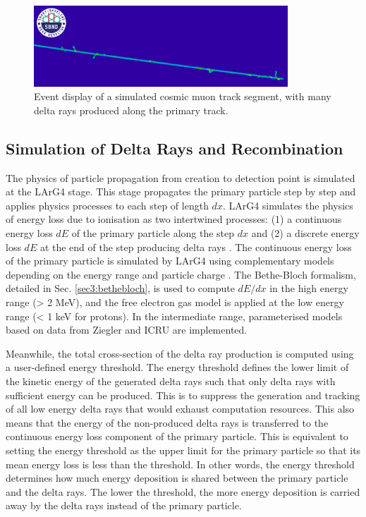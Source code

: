 \begin{figure}[bp!] 
\centering    
\includegraphics[width=0.85\textwidth]{delta_ray_evd}
\caption[delta_ray_evd]{
Event display of a simulated cosmic muon track segment, with many delta rays produced along the primary track.
}
\label{fig:delta_ray_evd}
\end{figure}


\subsection{Simulation of Delta Rays and Recombination}
\label{sec:simDeltaRay}

The physics of particle propagation from creation to detection point is simulated at the LArG4 stage.
This stage propagates the primary particle step by step and applies physics processes to each step of length $dx$.
LArG4 simulates the physics of energy loss due to ionisation as two intertwined processes: (1) a continuous energy loss $dE$ of the primary particle along the step $dx$ and (2) a discrete energy loss $dE$ at the end of the step producing delta rays \cite{geant4}.
The continuous energy loss of the primary particle is simulated by LArG4 using complementary models depending on the energy range and particle charge \cite{geant4_ions}.
The Bethe-Bloch formalism, detailed in Sec. \ref{sec3:bethebloch}, is used to compute $dE/dx$ in the high energy range (> 2 MeV), and the free electron gas model is applied at the low energy range (< 1 keV for protons).
In the intermediate range, parameterised models based on data from Ziegler \cite{Ziegler} and ICRU \cite{ICRU} are implemented.

Meanwhile, the total cross-section of the delta ray production is computed using a user-defined energy threshold.
The energy threshold defines the lower limit of the kinetic energy of the generated delta rays such that only delta rays with sufficient energy can be produced.
This is to suppress the generation and tracking of all low energy delta rays that would exhaust computation resources.
This also means that the energy of the non-produced delta rays is transferred to the continuous energy loss component of the primary particle.
This is equivalent to setting the energy threshold as the upper limit for the primary particle so that its mean energy loss is less than the threshold.
In other words, the energy threshold determines how much energy deposition is shared between the primary particle and the delta rays. 
The lower the threshold, the more energy deposition is carried away by the delta rays instead of the primary particle. 

